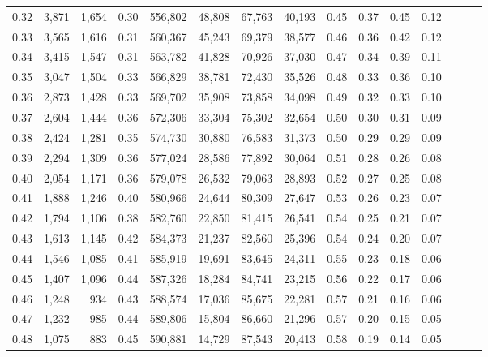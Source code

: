 \begin{tabular}{rrrrrrrrrrrrrrr}
0.32 &   3,871 &  1,654 &  0.30 &  556,802 &   48,808 &   67,763 &   40,193 &  0.45 &  0.37 &  0.45 &      0.12 \\
0.33 &   3,565 &  1,616 &  0.31 &  560,367 &   45,243 &   69,379 &   38,577 &  0.46 &  0.36 &  0.42 &      0.12 \\
0.34 &   3,415 &  1,547 &  0.31 &  563,782 &   41,828 &   70,926 &   37,030 &  0.47 &  0.34 &  0.39 &      0.11 \\
0.35 &   3,047 &  1,504 &  0.33 &  566,829 &   38,781 &   72,430 &   35,526 &  0.48 &  0.33 &  0.36 &      0.10 \\
0.36 &   2,873 &  1,428 &  0.33 &  569,702 &   35,908 &   73,858 &   34,098 &  0.49 &  0.32 &  0.33 &      0.10 \\
0.37 &   2,604 &  1,444 &  0.36 &  572,306 &   33,304 &   75,302 &   32,654 &  0.50 &  0.30 &  0.31 &      0.09 \\
0.38 &   2,424 &  1,281 &  0.35 &  574,730 &   30,880 &   76,583 &   31,373 &  0.50 &  0.29 &  0.29 &      0.09 \\
0.39 &   2,294 &  1,309 &  0.36 &  577,024 &   28,586 &   77,892 &   30,064 &  0.51 &  0.28 &  0.26 &      0.08 \\
0.40 &   2,054 &  1,171 &  0.36 &  579,078 &   26,532 &   79,063 &   28,893 &  0.52 &  0.27 &  0.25 &      0.08 \\
0.41 &   1,888 &  1,246 &  0.40 &  580,966 &   24,644 &   80,309 &   27,647 &  0.53 &  0.26 &  0.23 &      0.07 \\
0.42 &   1,794 &  1,106 &  0.38 &  582,760 &   22,850 &   81,415 &   26,541 &  0.54 &  0.25 &  0.21 &      0.07 \\
0.43 &   1,613 &  1,145 &  0.42 &  584,373 &   21,237 &   82,560 &   25,396 &  0.54 &  0.24 &  0.20 &      0.07 \\
0.44 &   1,546 &  1,085 &  0.41 &  585,919 &   19,691 &   83,645 &   24,311 &  0.55 &  0.23 &  0.18 &      0.06 \\
0.45 &   1,407 &  1,096 &  0.44 &  587,326 &   18,284 &   84,741 &   23,215 &  0.56 &  0.22 &  0.17 &      0.06 \\
0.46 &   1,248 &    934 &  0.43 &  588,574 &   17,036 &   85,675 &   22,281 &  0.57 &  0.21 &  0.16 &      0.06 \\
0.47 &   1,232 &    985 &  0.44 &  589,806 &   15,804 &   86,660 &   21,296 &  0.57 &  0.20 &  0.15 &      0.05 \\
0.48 &   1,075 &    883 &  0.45 &  590,881 &   14,729 &   87,543 &   20,413 &  0.58 &  0.19 &  0.14 &      0.05 \\

\end{tabular}
